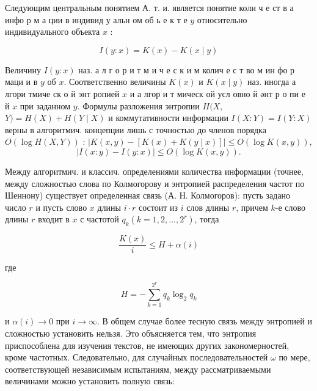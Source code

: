 \documentclass[10pt]{article}
\begin{document}
Следующим центральным понятием А. т. и. является понятие коли ч е ст в а инфо р м а ции в индивид у альн ом об ь е к т е $y$ относительно индивидуального объекта $x$ :



\[

I(y: x)=K(x)-K(x \mid y)

\]



Величину $I(y: x)$ наз. а л г о р и т м и ч е с к и м колич е с т во м ин фо р маци и в $y$ об $x$. Соответственно величины $K(x)$ и $K(x \mid y)$ наз. иногда а лгори тмиче ск о й энт ропией $x$ и а лгор и т мическ ой усл овно й әнт р о пи е й $x$ при заданном $y$. Формулы разложения энтропии $H(X$, $Y)=H(X)+H(Y \mid X)$ и коммутативности информации $I(X: Y)=I(Y: X)$ верны в алгоритмич. концепции лишь с точностью до членов порядка $O(\log H(X, Y))$ : $|K(x, y)-[K(x)+K(y \mid x)]| \leqslant O(\log K(x, y))$,\[

|I(x: y)-I(y: x)| \leqslant O(\log K(x, y)) .

\]



Между алгоритмич. и классич. определениями количества информации (точнее, между сложностью слова по Колмогорову и энтропией распределения частот по Шеннону) существует определенная связь (А. Н. Колмогоров): пусть задано число $r$ и пусть слово $x$ длины $i \cdot r$ состоит из $i$ слов длины $r$, причем $k$-е слово длины $r$ входит в $x$ с частотой $q_{k}\left(k=1,2, \ldots, 2^{r}\right)$, тогда



\[

\frac{K(x)}{i} \leq H+\alpha(i)

\]



где



\[

H=-\sum_{k=1}^{2^{r}} q_{k} \log _{2} q_{k}

\]



и $\alpha(i) \rightarrow 0$ при $i \rightarrow \infty$. В общем случае более тесную связь между энтропией и сложностью установить нельзя. Это объясняется тем, что энтропия приспособлена для изучения текстов, не имеющих других закономерностей, кроме частотных. Следовательно, для случайных последовательностей $\omega$ по мере, соответствующей независимым испытаниям, между рассматриваемыми величинами можно установить полную связь:
\end{document}
